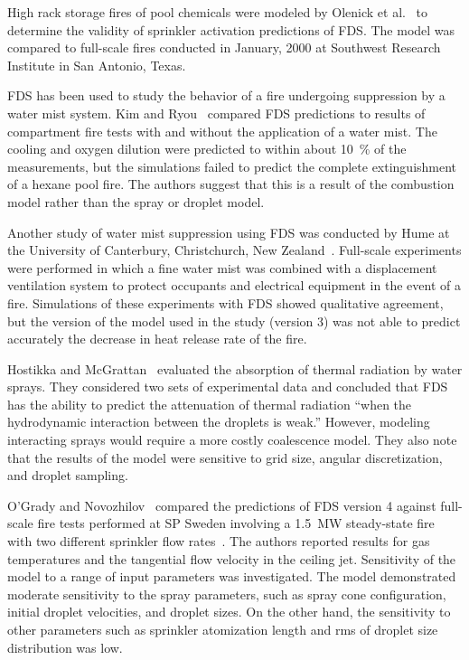 High rack storage fires of pool chemicals were modeled by Olenick et al.~\cite{Olenick:1} to determine the validity of sprinkler activation predictions of FDS. The model was compared to full-scale fires conducted in January, 2000 at Southwest Research Institute in San Antonio, Texas.

FDS has been used to study the behavior of a fire undergoing suppression by a water mist system. Kim and Ryou~\cite{Kim:BE2003,Kim:IJACR2004}  compared FDS  predictions to results of compartment fire tests with and without the application of a water mist. The cooling and oxygen dilution were predicted to within about 10~\% of the measurements, but the simulations failed to predict the complete extinguishment of a hexane pool fire. The authors suggest that this is a result of the combustion model rather than the spray or droplet model.

Another study of water mist suppression using FDS was conducted by Hume  at  the  University  of  Canterbury,  Christchurch,  New Zealand~\cite{Hume:Masters}. Full-scale experiments were performed in which a fine water mist was combined with a displacement ventilation system to protect occupants and electrical equipment in the event of a fire. Simulations of these experiments with FDS showed qualitative agreement, but the version of the model used in the study (version 3) was not able to predict accurately the decrease in heat release rate of the fire.

Hostikka  and  McGrattan~\cite{Hostikka:FSJ2006}  evaluated  the absorption of thermal radiation by water sprays. They considered two sets of experimental data and concluded that FDS has the ability to predict the attenuation of thermal radiation ``when the hydrodynamic interaction between  the droplets is  weak.'' However, modeling interacting sprays would require a more costly coalescence model. They also note that the results of the model were sensitive to grid size, angular discretization, and droplet sampling.

O'Grady and Novozhilov~\cite{OGrady:CST} compared the predictions of FDS version 4 against full-scale fire tests performed at SP Sweden involving a 1.5~MW steady-state fire with two different sprinkler flow rates~\cite{Ingason:1}. The authors reported results for gas temperatures and the tangential flow velocity in the ceiling jet. Sensitivity of the model to a range of input parameters was investigated. The model demonstrated moderate sensitivity to the spray parameters, such as spray cone configuration, initial droplet velocities, and droplet sizes. On the other hand, the sensitivity to other parameters such as sprinkler atomization length and rms of droplet size distribution was low.

